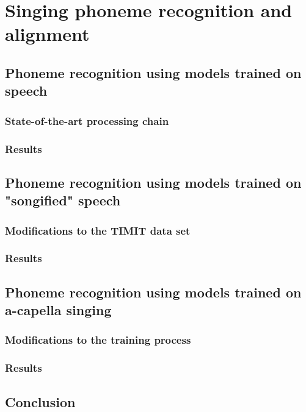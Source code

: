 \chapter{Singing phoneme recognition and alignment} \label{chap:phonerec}
\section{Phoneme recognition using models trained on speech}
\subsection{State-of-the-art processing chain}
\subsection{Results}
\section{Phoneme recognition using models trained on "songified" speech}
\subsection{Modifications to the TIMIT data set}
\subsection{Results}
\section{Phoneme recognition using models trained on a-capella singing}
\subsection{Modifications to the training process}
\subsection{Results}
\section{Conclusion}
